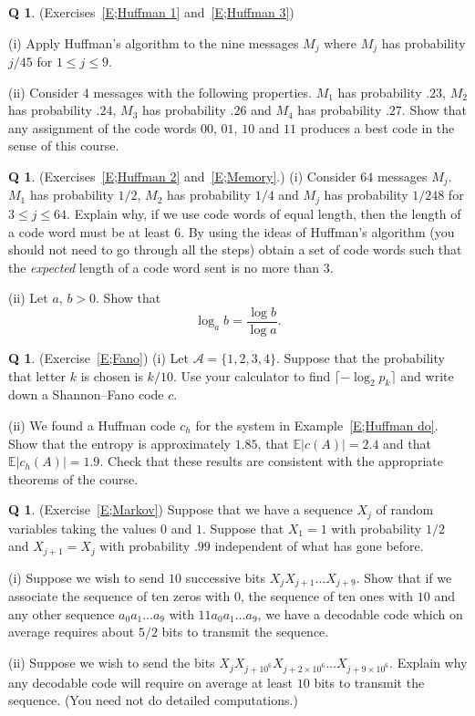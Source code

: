\documentclass[12pt,a4paper]{article}
\theoremstyle{plain}
\theoremstyle{definition}
\newtheorem{question}[theorem]{Q}
\begin{document}
\begin{question}\label{C1.4}\label{E;Huffman 1 again} 
(Exercises~\ref{E;Huffman 1} and~\ref{E;Huffman 3})

(i) Apply Huffman's algorithm to the nine messages $M_{j}$ where
$M_{j}$ has probability $j/45$
for $1\leq j\leq 9$.

(ii) Consider 
$4$ messages with the following properties. 
$M_{1}$ has probability $.23$,
$M_{2}$ has probability $.24$,
$M_{3}$ has probability $.26$
and $M_{4}$ has probability $.27$. Show that any
assignment of the code words $00$, $01$, $10$
and $11$ produces a best code in the sense of this course.
\end{question}
\begin{question}\label{C1.5} 
(Exercises~\ref{E;Huffman 2} and~\ref{E;Memory}.)
(i) Consider $64$ messages $M_{j}$.
$M_{1}$ has probability $1/2$,
$M_{2}$ has probability $1/4$ and $M_{j}$ has probability
$1/248$ for $3\leq j\leq 64$. 
Explain why, if we use code words of equal length,
then the length of a code word must be at least $6$.
By using the ideas of Huffman's algorithm (you should not
need to go through all the steps) obtain a set of
code words such that the \emph{expected} length of a code word
sent is no more than $3$.

(ii) Let $a,\,b>0$. Show that
\[\log_{a} b=\frac{\log b}{\log a}.\]
\end{question}
\begin{question}\label{C1.6} (Exercise~\ref{E;Fano})
(i) Let ${\mathcal A}=\{1,2,3,4\}$. Suppose that the
probability
that letter $k$ is chosen is $k/10$.
Use your calculator
to find $\lceil -\log_{2} p_{k}\rceil$
and write down a Shannon--Fano
code $c$.

(ii) We found a Huffman code $c_{h}$ for the system
in Example~\ref{E;Huffman do}.
Show
that the entropy is approximately $1.85$,
that ${\mathbb E}|c(A)|=2.4$
and that  ${\mathbb E}|c_{h}(A)|=1.9$.
Check that these results are consistent with
the appropriate theorems of the course.
\end{question}
\begin{question}\label{C1.7} 
(Exercise~\ref{E;Markov})
Suppose that we have a sequence
$X_{j}$ of random variables taking the values
$0$ and $1$. Suppose that $X_{1}=1$ with probability $1/2$
and
$X_{j+1}=X_{j}$ with probability
$.99$ independent of what has gone before.

(i) Suppose we wish to send $10$ successive bits
$X_{j}X_{j+1}\dots X_{j+9}$. Show that if we associate
the sequence of ten zeros with $0$, the sequence
of ten ones with $10$ and any other sequence
$a_{0}a_{1}\dots a_{9}$ with $11a_{0}a_{1}\dots a_{9}$,
we have a decodable code which on average requires
about $5/2$ bits to transmit the sequence.

(ii) Suppose we wish to send the bits
$X_{j}X_{j+10^{6}}X_{j+2\times 10^{6}}\dots X_{j+9\times 10^{6}}$. 
Explain why any decodable code will require
on average at least $10$ bits to transmit the sequence.
(You need not do detailed computations.)
\end{question}
\end{document}
